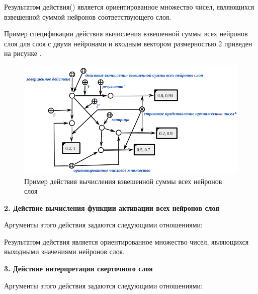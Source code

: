 Результатом действия() является ориентированное множество чисел, являющихся взвешенной суммой нейронов соответствующего слоя.

Пример спецификации действия вычисления взвешенной суммы всех нейронов слоя для слоя с двумя нейронами и входным вектором размерностью 2 приведен на рисунке .

\begin{figure}
	\centering
	\includegraphics[width=0.95\linewidth]{author/part3/figures/action_weighted_sum.png}
	\caption{Пример действия вычисления взвешенной суммы всех нейронов слоя}
	\label{fig:action_weighted_sum}
\end{figure}


\textbf{2. Действие вычисления функции активации всех нейронов слоя}

Аргументы этого действия задаются следующими отношениями:
\begin{SCn}


\end{SCn}

Результатом действия является ориентированное множество чисел, являющихся выходными значениями нейронов слоя.


\textbf{3. Действие интерпретации сверточного слоя}

Аргументы этого действия задаются следующими отношениями:
\begin{SCn}


\end{SCn}

